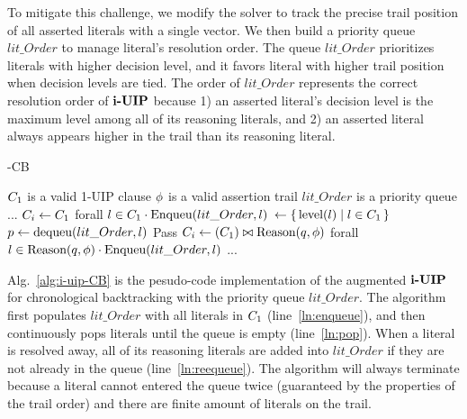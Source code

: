 To mitigate this challenge, we modify the solver to track the precise trail position of all asserted literals with a single vector. We then build a priority queue $lit\_Order$ to manage literal's resolution order. The queue $lit\_Order$  prioritizes literals with higher decision level, and it favors literal with higher trail position when decision levels are tied. The order of $lit\_Order$  represents the correct resolution order of $\textbf{i-UIP}$ because 1) an asserted literal's decision level is the maximum level among all of its reasoning literals, and 2) an asserted literal always appears higher in the trail than its reasoning literal.  

\begin{algorithm}[t]
\caption{\IUIP-CB}\label{alg:i-uip-CB}
\begin{algorithmic}[1]
\Require  $C_{1}$ is a valid 1-UIP clause
\Require  $\phi$ is a valid assertion trail
\Require  $lit\_Order$ is a priority queue
    \State ...
    \State $C_{i} \gets C_{1} $ 
    \State forall $l \in C_{1} \cdot \text{Enqueu}(lit\_Order, l)$  \label{ln:enqueue}
    \State {} $\gets \{\,\text{level}(l)\mid l \in C_{1}\,\}$
     \label{ln:pop}
        \State $p \gets \text{dequeu}(lit\_Order, l) $ \label{ln:dequeue}
         \label{ln:resolvable}
          \State Pass
        \Else 
            \State  $C_{i} \gets (C_{1} ) \bowtie \text{Reason}(q, \phi)$
            \State   forall $l \in \text{Reason}(q, \phi) \cdot \text{Enqueu}(lit\_Order, l)$ \label{ln:reequeue}
        \EndIf
    \EndWhile
\State ...
\EndProcedure
\end{algorithmic}
\end{algorithm}

Alg.~\ref{alg:i-uip-CB} is the pesudo-code implementation of the augmented $\textbf{i-UIP}$ for chronological backtracking with the priority queue $lit\_Order$. The algorithm first populates $lit\_Order$ with all literals in $C_{1}$ (line~\ref{ln:enqueue}), and then continuously pops literals until the queue is empty (line~\ref{ln:pop}). When a literal is resolved away, all of its reasoning literals are added into $lit\_Order$ if they are not already in the queue (line~\ref{ln:reequeue}). The algorithm will always terminate because a literal cannot entered the queue twice (guaranteed by the properties of the trail order) and there are finite amount of literals on the trail.
